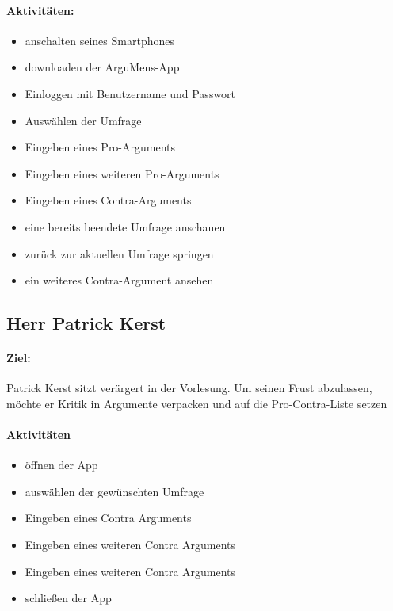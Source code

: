 \paragraph{Aktivitäten:}
\begin{itemize}
\item anschalten seines Smartphones
\item downloaden der ArguMens-App 
\item Einloggen mit Benutzername und Passwort
\item Auswählen der Umfrage
\item Eingeben eines Pro-Arguments
\item Eingeben eines weiteren Pro-Arguments
\item Eingeben eines Contra-Arguments
\item eine bereits beendete Umfrage anschauen
\item zurück zur aktuellen Umfrage springen
\item ein weiteres Contra-Argument ansehen
\end{itemize}

\subsection{Herr Patrick Kerst}

\paragraph{Ziel:} Patrick Kerst sitzt verärgert in der Vorlesung. Um seinen Frust abzulassen, möchte er Kritik in Argumente verpacken und auf die Pro-Contra-Liste setzen

\paragraph{Aktivitäten}
\begin{itemize}
\item öffnen der App
\item auswählen der gewünschten Umfrage
\item Eingeben eines Contra Arguments 
\item Eingeben eines weiteren Contra Arguments 
\item Eingeben eines weiteren Contra Arguments
\item schließen der App 
\end{itemize}

\clearpage